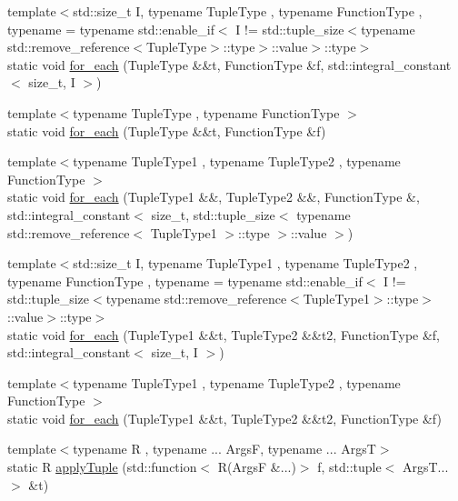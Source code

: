 \begin{DoxyCompactItemize}
\item 
{\footnotesize template$<$std\+::size\+\_\+t I, typename Tuple\+Type , typename Function\+Type , typename  = typename std\+::enable\+\_\+if$<$            I != std\+::tuple\+\_\+size$<$typename std\+::remove\+\_\+reference$<$\+Tuple\+Type$>$\+::type$>$\+::value$>$\+::type$>$ }\\static void \mbox{\hyperlink{structfakeit_1_1TupleDispatcher_afd32e025fbf695e16bb4b4ac1642c491}{for\+\_\+each}} (Tuple\+Type \&\&t, Function\+Type \&f, std\+::integral\+\_\+constant$<$ size\+\_\+t, I $>$)
\item 
{\footnotesize template$<$typename Tuple\+Type , typename Function\+Type $>$ }\\static void \mbox{\hyperlink{structfakeit_1_1TupleDispatcher_a8fd292a71795aae0aba215dad28ee4c2}{for\+\_\+each}} (Tuple\+Type \&\&t, Function\+Type \&f)
\item 
{\footnotesize template$<$typename Tuple\+Type1 , typename Tuple\+Type2 , typename Function\+Type $>$ }\\static void \mbox{\hyperlink{structfakeit_1_1TupleDispatcher_a30fb1a59df83f4faaa461d3fee4b20bc}{for\+\_\+each}} (Tuple\+Type1 \&\&, Tuple\+Type2 \&\&, Function\+Type \&, std\+::integral\+\_\+constant$<$ size\+\_\+t, std\+::tuple\+\_\+size$<$ typename std\+::remove\+\_\+reference$<$ Tuple\+Type1 $>$\+::type $>$\+::value $>$)
\item 
{\footnotesize template$<$std\+::size\+\_\+t I, typename Tuple\+Type1 , typename Tuple\+Type2 , typename Function\+Type , typename  = typename std\+::enable\+\_\+if$<$            I != std\+::tuple\+\_\+size$<$typename std\+::remove\+\_\+reference$<$\+Tuple\+Type1$>$\+::type$>$\+::value$>$\+::type$>$ }\\static void \mbox{\hyperlink{structfakeit_1_1TupleDispatcher_a42566b7faaac776dc99492e7c0b973b3}{for\+\_\+each}} (Tuple\+Type1 \&\&t, Tuple\+Type2 \&\&t2, Function\+Type \&f, std\+::integral\+\_\+constant$<$ size\+\_\+t, I $>$)
\item 
{\footnotesize template$<$typename Tuple\+Type1 , typename Tuple\+Type2 , typename Function\+Type $>$ }\\static void \mbox{\hyperlink{structfakeit_1_1TupleDispatcher_a1ddb90f24aa73dd61bf2b95c5f176cd5}{for\+\_\+each}} (Tuple\+Type1 \&\&t, Tuple\+Type2 \&\&t2, Function\+Type \&f)
\item 
{\footnotesize template$<$typename R , typename ... ArgsF, typename ... ArgsT$>$ }\\static R \mbox{\hyperlink{structfakeit_1_1TupleDispatcher_ac57ede994f304c03e3982e6fa4d1ca41}{apply\+Tuple}} (std\+::function$<$ R(ArgsF \&...)$>$ f, std\+::tuple$<$ Args\+T... $>$ \&t)

\end{DoxyCompactItemize}
